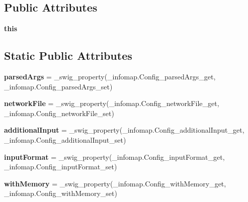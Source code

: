 \subsection*{Public Attributes}
\begin{DoxyCompactItemize}
\item 
\mbox{\label{classinfomapfolder_1_1infomap_1_1Config_a7edd0cd9942b601170f46acf8a1d1809}} 
{\bfseries this}
\end{DoxyCompactItemize}
\subsection*{Static Public Attributes}
\begin{DoxyCompactItemize}
\item 
\mbox{\label{classinfomapfolder_1_1infomap_1_1Config_ae12bfb82a5f0a475d7667d07b8d6467e}} 
{\bfseries parsed\+Args} = \+\_\+swig\+\_\+property(\+\_\+infomap.\+Config\+\_\+parsed\+Args\+\_\+get, \+\_\+infomap.\+Config\+\_\+parsed\+Args\+\_\+set)
\item 
\mbox{\label{classinfomapfolder_1_1infomap_1_1Config_a96702dd8e2ae3ef0a3fd708808add870}} 
{\bfseries network\+File} = \+\_\+swig\+\_\+property(\+\_\+infomap.\+Config\+\_\+network\+File\+\_\+get, \+\_\+infomap.\+Config\+\_\+network\+File\+\_\+set)
\item 
\mbox{\label{classinfomapfolder_1_1infomap_1_1Config_a5d549275d739694a7d5688ea042c3215}} 
{\bfseries additional\+Input} = \+\_\+swig\+\_\+property(\+\_\+infomap.\+Config\+\_\+additional\+Input\+\_\+get, \+\_\+infomap.\+Config\+\_\+additional\+Input\+\_\+set)
\item 
\mbox{\label{classinfomapfolder_1_1infomap_1_1Config_a9cc858d1ba3acddf2366296683f25db6}} 
{\bfseries input\+Format} = \+\_\+swig\+\_\+property(\+\_\+infomap.\+Config\+\_\+input\+Format\+\_\+get, \+\_\+infomap.\+Config\+\_\+input\+Format\+\_\+set)
\item 
\mbox{\label{classinfomapfolder_1_1infomap_1_1Config_a51750ba6011ee12012ef52df2790ab0f}} 
{\bfseries with\+Memory} = \+\_\+swig\+\_\+property(\+\_\+infomap.\+Config\+\_\+with\+Memory\+\_\+get, \+\_\+infomap.\+Config\+\_\+with\+Memory\+\_\+set)

\end{DoxyCompactItemize}

